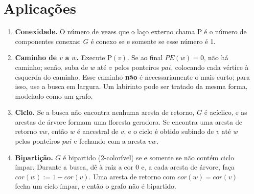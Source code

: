 
\section{Aplicações}\label{sec:dfsapl}
\begin{enumerate}
  \item \textbf{Conexidade.} O número de vezes que o laço externo chama \textsc{P} é o número de componentes conexas; $G$ é conexo se e somente se esse número é 1.
  \item \textbf{Caminho de $v$ a $w$.} Execute \textsc{P}$(v)$. Se ao final $PE(w)=0$, não há caminho; senão, suba de $w$ até $v$ pelos ponteiros $pai$, colocando cada vértice à esquerda do caminho. Esse caminho \textbf{não} é necessariamente o mais curto; para isso, use a busca em largura. Um labirinto pode ser tratado da mesma forma, modelado como um grafo.
  \item \textbf{Ciclo.} Se a busca não encontra nenhuma aresta de retorno, $G$ é acíclico, e as arestas de árvore formam uma floresta geradora. Se encontra uma aresta de retorno $vw$, então $w$ é ancestral de $v$, e o ciclo é obtido subindo de $v$ até $w$ pelos ponteiros $pai$ e fechando com a aresta $vw$.
  \item \textbf{Bipartição.} $G$ é bipartido (2-colorível) se e somente se não contém ciclo ímpar. Durante a busca, dê à raiz a cor 0 e, a cada aresta de árvore, faça $cor(w):=1-cor(v)$. Uma aresta de retorno com $cor(w)=cor(v)$ fecha um ciclo ímpar, e então o grafo não é bipartido.
\end{enumerate}

